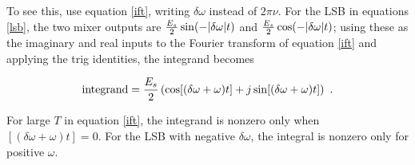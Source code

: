 \documentclass[11pt,preprint]{aastex}
\begin{document}
To see this, use equation \ref{ift}, writing $\delta \omega$ instead of
$2 \pi \nu$.  For the LSB in equations \ref{lsb}, the two mixer outputs
are ${E_s \over 2} \sin(-|\delta \omega|t)$ and ${E_s \over 2}
\cos(-|\delta \omega|t)$; using these as the imaginary and real inputs
to the Fourier transform of equation \ref{ift} and applying the trig
identities, the integrand becomes

\begin{equation}
{\rm integrand} = {E_s \over 2} \left( \cos[(\delta \omega +
    \omega)t] + j \sin[(\delta \omega + \omega)t] \right) \ .
\end{equation}

\noindent For large $T$ in equation \ref{ift}, the integrand is nonzero
only when $[(\delta \omega + \omega)t] =0$. For the LSB with negative
$\delta \omega$, the integral is nonzero only for positive $\omega$.
\end{document}
